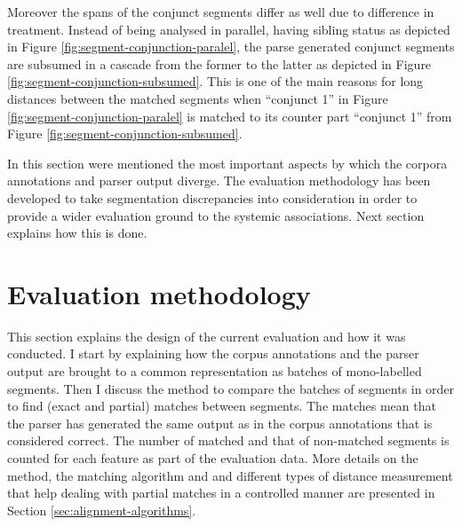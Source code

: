     Moreover the spans of the conjunct segments differ as well due to difference in treatment. Instead of being analysed in parallel, having sibling status as depicted in Figure \ref{fig:segment-conjunction-paralel}, the parse generated conjunct segments are subsumed in a cascade from the former to the latter as depicted in Figure \ref{fig:segment-conjunction-subsumed}. This is one of the main reasons for long distances between the matched segments when ``conjunct 1'' in Figure \ref{fig:segment-conjunction-paralel} is matched to its counter part ``conjunct 1'' from Figure \ref{fig:segment-conjunction-subsumed}. 
    
    In this section were mentioned the most important aspects by which the corpora annotations and parser output diverge. The evaluation methodology has been developed to take segmentation discrepancies into consideration in order to provide a wider evaluation ground to the systemic associations. Next section explains how this is done.
    
\section{Evaluation methodology}
\label{sec:evaluation-methodology}
    
    This section explains the design of the current evaluation and how it was conducted. I start by explaining how the corpus annotations and the parser output are brought to a common representation as batches of mono-labelled segments. Then I discuss the method to compare the batches of segments in order to find (exact and partial) matches between segments. The matches mean that the parser has generated the same output as in the corpus annotations that is considered correct. The number of matched and that of non-matched segments is counted for each feature as part of the evaluation data. More details on the method, the matching algorithm and and different types of distance measurement that help dealing with partial matches in a controlled manner are presented in Section \ref{sec:alignment-algorithms}.
    

